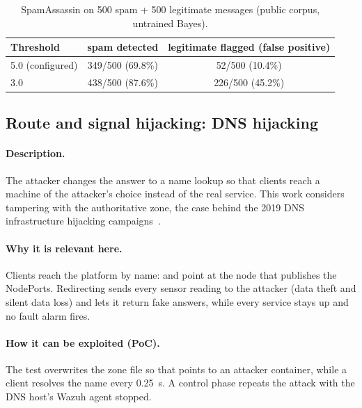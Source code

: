 \begin{table}[ht]
\centering\small
\caption{SpamAssassin on 500 spam + 500 legitimate messages (public corpus, untrained Bayes).}
\label{tab:corpus}
\begin{tabular}{@{}lcc@{}}
\toprule
Threshold & spam detected & legitimate flagged (false positive) \\
\midrule
5.0 (configured) & 349/500 (69.8\%) & 52/500 (10.4\%) \\
3.0 & 438/500 (87.6\%) & 226/500 (45.2\%) \\
\bottomrule
\end{tabular}
\end{table}

\subsection{Route and signal hijacking: DNS hijacking}

\paragraph{Description.}
The attacker changes the answer to a name lookup so that clients reach a machine of the attacker's
choice instead of the real service. This work considers tampering with the authoritative zone, the case
behind the 2019 DNS infrastructure hijacking campaigns~\cite{cisa2019ed1901}.

\paragraph{Why it is relevant here.}
Clients reach the platform by name:  and 
point at the node that publishes the NodePorts. Redirecting  sends every sensor
reading to the attacker (data theft and silent data loss) and lets it return fake answers, while
every service stays up and no fault alarm fires.

\paragraph{How it can be exploited (PoC).}
The test overwrites the zone file  so that
 points to an attacker container, while a client resolves the name every
0.25~s. A control phase repeats the attack with the DNS host's Wazuh agent stopped.

